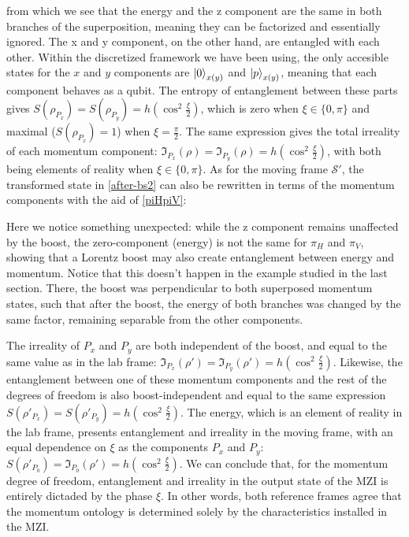 \documentclass[12pt,a4paper,notitlepage]{report}
\begin{document}
%
from which we see that the energy and the z component are the same in both branches of the superposition, meaning they can be factorized and essentially ignored. The x and y component, on the other hand, are entangled with each other. Within the discretized framework we have been using, the only accesible states for the $x$ and $y$ components are $\ket{0}_{x(y)}$ and $\ket{p}_{x(y)}$, meaning that each component behaves as a qubit. The entropy of entanglement between these parts gives $S(\rho_{P_x}) = S(\rho_{P_y}) = h(\cos^2\frac{\xi}{2})$, which is zero when $\xi \in \{ 0,\pi \}$ and maximal ($S(\rho_{P_x}) = 1$) when $\xi = \frac{\pi}{2}$. The same expression gives the total irreality of each momentum component: $\mathfrak{I}_{P_x}(\rho) = \mathfrak{I}_{P_y}(\rho) = h(\cos^2\frac{\xi}{2})$, with both being elements of reality when $\xi \in \{0, \pi \}$. As for the moving frame $\mathcal{S}'$, the transformed state in \eqref{after-bs2} can also be rewritten in terms of the momentum components with the aid of \eqref{piHpiV}:

%
Here we notice something unexpected: while the z component remains unaffected by the boost, the zero-component (energy) is not the same for $\pi_H$ and $\pi_V$, showing that a Lorentz boost may also create entanglement between energy and momentum. Notice that this doesn't happen in the example studied in the last section. There, the boost was perpendicular to both superposed momentum states, such that after the boost, the energy of both branches was changed by the same factor, remaining separable from the other components.

The irreality of $P_x$ and $P_y$ are both independent of the boost, and equal to the same value as in the lab frame: $\mathfrak{I}_{P_x}(\rho') = \mathfrak{I}_{P_y}(\rho') = h(\cos^2\frac{\xi}{2})$. Likewise, the entanglement between one of these momentum components and the rest of the degrees of freedom is also boost-independent and equal to the same expression $S(\rho'_{P_x}) = S(\rho'_{P_y}) = h(\cos^2\frac{\xi}{2})$. The energy, which is an element of reality in the lab frame, presents entanglement and irreality in the moving frame, with an equal dependence on $\xi$ as the components $P_x$ and $P_y$: $S(\rho'_{P_0}) = \mathfrak{I}_{P_0}(\rho') = h(\cos^2\frac{\xi}{2})$. We can conclude that, for the momentum degree of freedom, entanglement and irreality in the output state of the MZI is entirely dictaded by the phase $\xi$. In other words, both reference frames agree that the momentum ontology is determined solely by the characteristics installed in the MZI.
\end{document}
